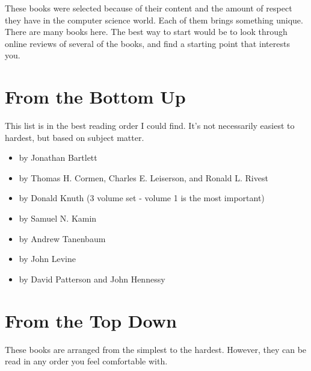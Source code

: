 These books were selected because of their content and the amount of respect
they have in the computer science world.  Each of them brings something
unique.  There are many books here.  The best way to start would be to
look through online reviews of several of the books, and find a starting
point that interests you.

\section{From the Bottom Up}

This list is in the best reading order I could find.  It's not necessarily
easiest to hardest, but based on subject matter.  

\begin{itemize}\item {} by Jonathan Bartlett 
\item {} by Thomas H. Cormen, Charles E. Leiserson, and Ronald L. Rivest 
\item {} by Donald Knuth (3 volume set - volume 1 is the most important) 
\item {} by Samuel N. Kamin 
\item {} by Andrew Tanenbaum 
\item {} by John Levine 
\item {} by David Patterson and John Hennessy 
\end{itemize}

\section{From the Top Down}

These books are arranged from the simplest to the hardest.  However, they
can be read in any order you feel comfortable with.

